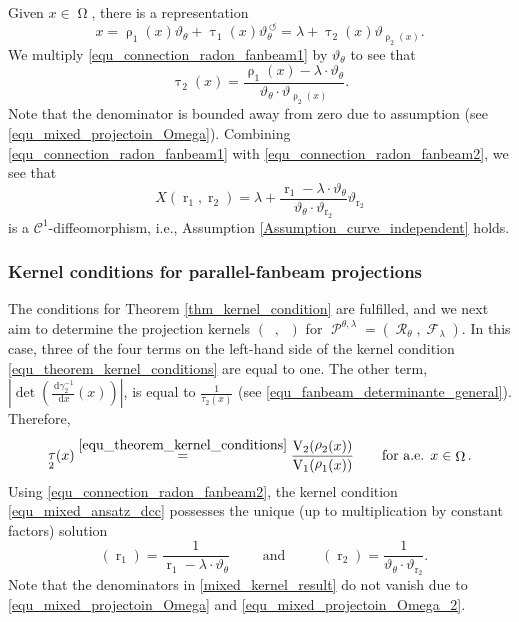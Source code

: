 \documentclass[12pt]{article}
\DeclareMathOperator{\Proj}{\mathcal{P}}
\newcommand{\dd}[1]{\,\mathrm{d}{#1}}
\DeclareMathOperator{\Radon}{\mathcal{R}}
\DeclareMathOperator{\Fanbeam}{\mathcal{F}}
\DeclareMathOperator{\rotated}{\,\circlearrowleft}
\DeclareMathOperator{\rayvariable}{r}
\DeclareMathOperator{\tinverse}{\tau}
\DeclareMathOperator{\rayinverse}{\rho}
\DeclareMathOperator{\Vone}{V_1}
\DeclareMathOperator{\Vtwo}{V_2}
\DeclareMathOperator{\imgdom}{{\Omega}}
\begin{document}
 
 Given $x\in \imgdom$, there is a representation
\begin{equation}
\label{equ_connection_radon_fanbeam1}
x=\rayinverse_1(x)\vartheta_{\theta}+\tinverse_1(x) \vartheta^{\rotated}_{\theta} = \lambda+ \tinverse_2(x) \vartheta_{\rayinverse_2(x)}.
\end{equation}
We multiply \eqref{equ_connection_radon_fanbeam1} by $\vartheta_{\theta}$ to see that
\begin{equation}
\label{equ_connection_radon_fanbeam2}
\tinverse_2(x)= \frac{\rayinverse_1(x)-\lambda\cdot \vartheta_{\theta}}{\vartheta_{\theta}\cdot \vartheta_{\rayinverse_2(x)}}.
\end{equation}
Note that the denominator is bounded away from zero due to assumption (see \eqref{equ_mixed_projectoin_Omega}).  Combining \eqref{equ_connection_radon_fanbeam1} with \eqref{equ_connection_radon_fanbeam2}, we see that 
 \begin{equation}
 X(\rayvariable_1,\rayvariable_2)=\lambda+ \frac{\rayvariable_1-\lambda\cdot \vartheta_{\theta}}{\vartheta_{\theta}\cdot \vartheta_{\rayvariable_2}} \vartheta_{\rayvariable_2}
\end{equation}
is a $\mathcal{C}^1$-diffeomorphism, i.e., Assumption \ref{Assumption_curve_independent} holds. 

\subsubsection*{Kernel conditions for parallel-fanbeam projections}
The conditions for Theorem \ref{thm_kernel_condition} are fulfilled, and we next aim to determine the projection kernels $(\Vone,\Vtwo)$ for $\Proj^{\theta,\lambda}=(\Radon_\theta,\Fanbeam_\lambda)$. In this case, three of the four terms on the left-hand side of the kernel condition  \eqref{equ_theorem_kernel_conditions} are equal to one. The other term, $\left|\det\left( \frac{\dd { \gamma_{2}^{-1}}   }{\dd x} (x) \right)\right|$, is equal to $\frac{1}{\tau_2(x)}$ (see \eqref{equ_fanbeam_determinante_general}). Therefore,
\begin{equation} \label{equ_mixed_ansatz_dcc}
\tinverse_2(x) \overset{\eqref{equ_theorem_kernel_conditions}}{=} \frac{\Vtwo(\rayinverse_2(x))}{\Vone(\rayinverse_1(x))} \qquad \text{for a.e. }x\in \imgdom.
\end{equation}
Using \eqref{equ_connection_radon_fanbeam2}, the kernel condition \eqref{equ_mixed_ansatz_dcc} possesses the unique (up to multiplication by constant factors) solution
\begin{equation}
\label{mixed_kernel_result}
\Vone(\rayvariable_1) = \frac{1}{\rayvariable_1-\lambda\cdot \vartheta_{\theta}} \qquad \text{ and} 
\qquad 
\Vtwo(\rayvariable_2) = \frac{1}{\vartheta_{\theta}\cdot \vartheta_{\rayvariable_2}}.
\end{equation}
Note that the denominators in \eqref{mixed_kernel_result} do not vanish due to \eqref{equ_mixed_projectoin_Omega} and \eqref{equ_mixed_projectoin_Omega_2}.
\end{document}
